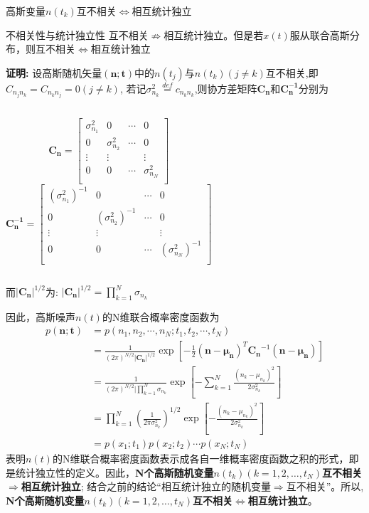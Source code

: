 \begin{frame}{高斯变量$n(t_k)$互不相关$\Leftrightarrow$相互统计独立}
	\begin{block}{不相关性与统计独立性}
		互不相关$\nRightarrow$相互统计独立。但是若$x(t)$服从联合高斯分布，则互不相关$\Leftrightarrow$相互统计独立
	\end{block}
\textbf{证明:} 设高斯随机矢量$\bm{(n;t)}$中的$n(t_j)$与$n(t_k)(j\ne k)$互不相关,即$C_{n_jn_k}=C_{n_kn_j}=0(j\ne k)$, 若记$\sigma_{n_k}^2\mathop{=}\limits^{def}c_{n_kn_k}$,则协方差矩阵$\bm{C_n}$和$\bm{C_n^{-1}}$分别为
	\begin{columns}
		$$
		\bm{C_n}=\left[
		\begin{matrix}
		\sigma_{n_1}^2 &  0                 & \cdots & 0\\
		0              &  \sigma_{n_2}^2  & \cdots & 0\\
		\vdots         &  \vdots            &        &\vdots \\
		0              &  0                 & \cdots &\sigma_{n_N}^2\\
		\end{matrix}
		\right]
		$$
		$$\bm{C_n^{-1}}=\left[
		\begin{matrix}
		(\sigma_{n_1}^2)^{-1} &  0                 & \cdots & 0\\
		0              &  (\sigma_{n_2}^2)^{-1}  & \cdots & 0\\
		\vdots         &  \vdots            &        &\vdots \\
		0              &  0                 & \cdots &(\sigma_{n_N}^2)^{-1}\\
		\end{matrix}
		\right]
		$$
	\end{columns}
	而$|\bm{C_n}|^{1/2}$为: $|\bm{C_n}|^{1/2}=\prod\limits_{k=1}^{N}\sigma_{n_k}$
\end{frame}

\begin{frame}
	因此，高斯噪声$n(t)$的N维联合概率密度函数为
	\begin{align*}
	p(\bm{n;t})&=p(n_1,n_2,\cdots,n_N; t_1,t_2,\cdots,t_N)\\
	&=\frac{1}{(2\pi)^{N/2}|\bm{C_n}|^{1/2}}\exp\left[-\frac{1}{2}(\bm{n-\mu_n})^T\bm{C_n}^{-1}(\bm{n-\mu_n})\right]\\
	&=\frac{1}{(2\pi)^{N/2}|\prod\limits_{k=1}^{N}\sigma_{n_k}}\exp\left[-\sum\limits_{k=1}^{N}\frac{(n_k-\mu_{n_k})^2}{2\sigma_{n_k}^2}\right]\\
	&=\prod\limits_{k=1}^{N}\left(\frac{1}{2\pi\sigma_{n_k}^2}\right)^{1/2}\exp\left[-\frac{(n_k-\mu_{n_k})^2}{2\sigma_{n_k}^2}\right]\\
	&=p(x_1;t_1)p(x_2;t_2)\cdots p(x_N;t_N)
	\end{align*}
	表明$n(t)$的N维联合概率密度函数表示成各自一维概率密度函数之积的形式，即是统计独立性的定义。因此，\textbf{N个高斯随机变量$n(t_k)(k=1,2,\dots,t_N)$互不相关$\Rightarrow$相互统计独立}; 结合之前的结论``相互统计独立的随机变量$\Rightarrow$互不相关''。所以, \textbf{
	N个高斯随机变量$n(t_k)(k=1,2,\dots,t_N)$互不相关$\Leftrightarrow$相互统计独立}。
\end{frame}

